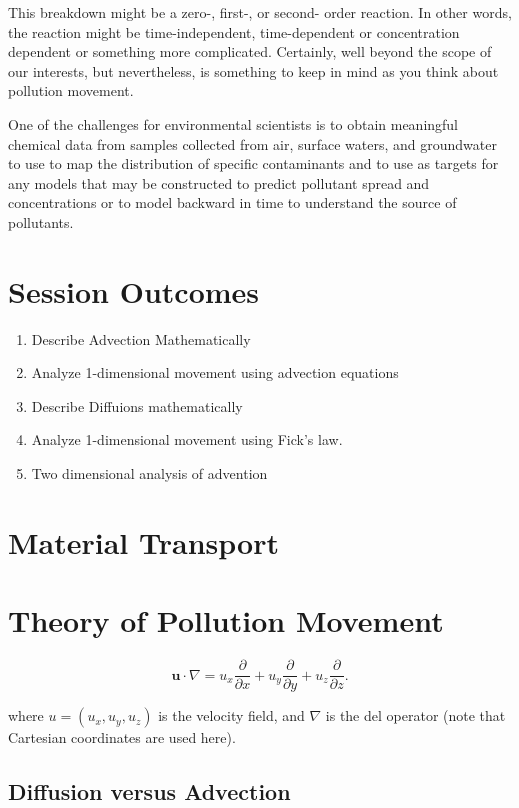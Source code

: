 \documentclass{article}
\begin{document}
This breakdown might be a zero-, first-, or second- order reaction. In other words, the reaction might be time-independent, time-dependent or concentration dependent or something more complicated. Certainly, well beyond the scope of our interests, but nevertheless, is something to keep in mind as you think about pollution movement. 

One of the challenges for environmental scientists is to obtain meaningful chemical data from samples collected from air, surface waters, and groundwater to use to map the distribution of specific contaminants and to use as targets for any models that may be constructed to predict pollutant spread and concentrations or to model backward in time to understand the source of pollutants. 

\section{Session Outcomes}
\begin{enumerate}
	\item Describe Advection Mathematically
	\item Analyze 1-dimensional movement using advection equations
	\item Describe Diffuions mathematically
	\item Analyze 1-dimensional movement using Fick's law.
	\item Two dimensional analysis of advention
\end{enumerate}

\section{Material Transport}

\section{Theory of Pollution Movement}

\begin{equation}
\mathbf{u} \cdot \nabla = u_x \frac{\partial}{\partial x} + u_y \frac{\partial}{\partial y} + u_z \frac{\partial}{\partial z}.
\end{equation}

where $u = (u_x, u_y, u_z)$ is the velocity field, and $\nabla$ is the del operator (note that Cartesian coordinates are used here).

\subsection{Diffusion versus Advection}
\end{document}
